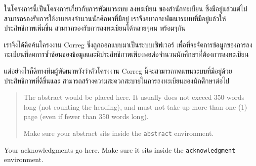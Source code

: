 \maketitle
\makesignature

\ifproject
\begin{abstractTH}

\enskip ในโครงการนี้เป็นโครงการเกี่ยวกับการพัฒนาระบบ ลงทะเบียน ของสำนักทะเบียน ซึ่งมีอยู่แล้วแต่ไม่สามารถรองรับการใช้งานของจำนวนนักศึกษาที่มีอยู่ เราจึงอยากจะพัฒนาระบบที่มีอยู่แล้วให้ประสิทธิภาพเพิ่มขึ้น สามารถรองรับการลงทะเบียนได้หลายๆคน พร้อมๆกัน

\enskip เราจึงได้คิดค้นโครงงาน Correg ซึ่งถูกออกแบบมาเป็นระบบเซิฟเวอร์ เพื่อที่จะจัดการข้อมูลของการลงทะเบียนที่ลดการซ้ำซ้อนของข้อมูลและมีประสิทธิภาพเพียงพอต่อจำนวนนักศึกษาที่ต้องการลงทะเบียน

\enskip แต่อย่างไรก็ดีทางทีมผู้พัฒนาหวังว่าตัวโครงงาน Correg นี้จะสามารถทดแทนระบบที่มีอยู่ด้วยประสิทธิภาพที่ดีขึ้นและ สามารถสร้างความสะดวกสะบายในการลงทะเบียนของนักศึกษาต่อไป
\end{abstractTH}

\begin{abstract}
The abstract would be placed here. It usually does not exceed 350 words
long (not counting the heading), and must not take up more than one (1) page
(even if fewer than 350 words long).

Make sure your abstract sits inside the \texttt{abstract} environment.
\end{abstract}

\iffalse
\begin{dedication}
This document is dedicated to all Chiang Mai University students.

Dedication page is optional.
\end{dedication}
\fi %

\begin{acknowledgments}
Your acknowledgments go here. Make sure it sits inside the
\texttt{acknowledgment} environment.

\end{acknowledgments}%
\fi %

\contentspage

\ifproject
\figurelistpage

\tablelistpage
\fi %



